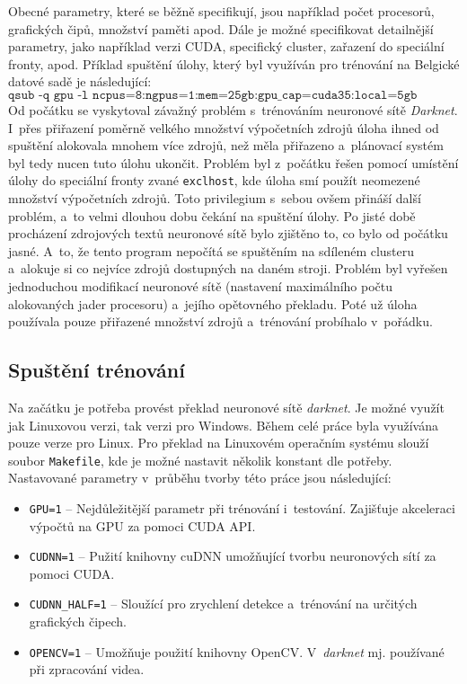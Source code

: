 Obecné parametry, které se běžně specifikují, jsou například počet procesorů, grafických čipů, množství paměti apod. Dále je možné specifikovat detailnější parametry, jako například verzi CUDA, specifický cluster, zařazení do speciální fronty, apod. Příklad spuštění úlohy, který byl využíván pro trénování na Belgické datové sadě je následující:
$$\texttt{qsub -q gpu -l ncpus=8:ngpus=1:mem=25gb:gpu\_cap=cuda35:local=5gb BTSD.sh}$$
Od počátku se vyskytoval závažný problém s~trénováním neuronové sítě \emph{Darknet}. I~přes přiřazení poměrně velkého množství výpočetních zdrojů úloha ihned od spuštění alokovala mnohem více zdrojů, než měla přiřazeno a~plánovací systém byl tedy nucen tuto úlohu ukončit. Problém byl z~počátku řešen pomocí umístění úlohy do speciální fronty zvané \texttt{exclhost}, kde úloha smí použít neomezené množství výpočetních zdrojů. Toto privilegium s~sebou ovšem přináší další problém, a~to velmi dlouhou dobu čekání na spuštění úlohy. Po jisté době procházení zdrojových textů neuronové sítě bylo zjištěno to, co bylo od počátku jasné. A~to, že tento program nepočítá se spuštěním na sdíleném clusteru a~alokuje si co nejvíce zdrojů dostupných na daném stroji. Problém byl vyřešen jednoduchou modifikací neuronové sítě (nastavení maximálního počtu alokovaných jader procesoru) a~jejího opětovného překladu. Poté už úloha používala pouze přiřazené množství zdrojů a~trénování probíhalo v~pořádku.

\subsection*{Spuštění trénování}
Na začátku je potřeba provést překlad neuronové sítě \emph{darknet}. Je možné využít jak Linuxovou verzi, tak verzi pro Windows. Během celé práce byla využívána pouze verze pro Linux. Pro překlad na Linuxovém operačním systému slouží soubor \texttt{Makefile}, kde je možné nastavit několik konstant dle potřeby. Nastavované parametry v~průběhu tvorby této práce jsou následující:

\begin{itemize}
    \item \texttt{GPU=1} -- Nejdůležitější parametr při trénování i~testování. Zajišťuje akceleraci výpočtů na GPU za pomoci CUDA API.
    \item \texttt{CUDNN=1} -- Pužití knihovny cuDNN umožňující tvorbu neuronových sítí za pomoci CUDA.
    \item \texttt{CUDNN\_HALF=1} -- Sloužící pro zrychlení detekce a~trénování na určitých grafických čipech.
    \item \texttt{OPENCV=1} -- Umožňuje použití knihovny OpenCV. V~\emph{darknet}  mj. používané při zpracování videa.
\end{itemize}

